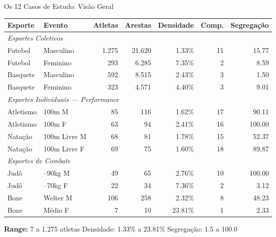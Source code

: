 \begin{frame}[shrink=3]{Os 12 Casos de Estudo: Visão Geral}
    \begin{center}
    \scriptsize
    \begin{tabular}{llrrrrr}
    \toprule
    \textbf{Esporte} & \textbf{Evento} & \textbf{Atletas} & \textbf{Arestas} & \textbf{Densidade} & \textbf{Comp.} & \textbf{Segregação} \\
    \midrule
    \multicolumn{7}{l}{\textit{Esportes Coletivos}} \\
    Futebol   & Masculino      & 1.275 & 21.620 & 1.33\%  & 11 & 15.77  \\
    Futebol   & Feminino       &   293 &  6.285 & 7.35\%  &  2 &  8.59  \\
    Basquete  & Masculino      &   592 &  8.515 & 2.43\%  &  3 &  1.50  \\
    Basquete  & Feminino       &   323 &  4.571 & 4.40\%  &  3 &  9.01  \\
    \midrule
    \multicolumn{7}{l}{\textit{Esportes Individuais --- Performance}} \\
    Atletismo & 100m M         &    85 &    116 & 1.62\%  & 17 & 90.11  \\
    Atletismo & 100m F         &    63 &     94 & 2.41\%  & 16 & 100.00 \\
    Natação   & 100m Livre M   &    68 &     81 & 1.78\%  & 15 & 52.37  \\
    Natação   & 100m Livre F   &    69 &     75 & 1.60\%  & 18 & 89.87  \\
    \midrule
    \multicolumn{7}{l}{\textit{Esportes de Combate}} \\
    Judô      & --90kg M       &    49 &     65 & 2.76\%  & 10 & 100.00 \\
    Judô      & --70kg F       &    22 &     34 & 7.36\%  &  2 &   3.12 \\
    Boxe      & Welter M       &   106 &    258 & 2.32\%  &  8 &  48.23 \\
    Boxe      & Médio F        &     7 &     10 & 23.81\% &  1 &   2.33 \\
    \bottomrule
    \end{tabular}
    \end{center}
    \vspace{0.1cm}
    \begin{center}
        \footnotesize
        \textbf{Range:} 7 a 1.275 atletas \quad Densidade: 1.33\% a 23.81\% \quad Segregação: 1.5 a 100.0
    \end{center}
\end{frame}

